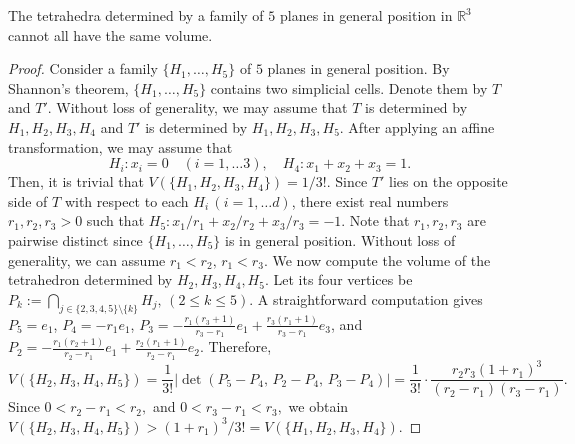 \documentclass[10pt,a4paper]{amsart}
\begin{document}
\begin{obs} \label{lem:redclique}
The tetrahedra determined by a family of $5$ planes in general position in $\mathbb{R}^3$ cannot all have the same volume.
\end{obs}

\begin{proof}
Consider a family $\{H_1, \ldots, H_5 \}$ of $5$ planes in general position. By Shannon's theorem, $\{H_1, \ldots, H_5 \}$ contains two simplicial cells. Denote them by $T$ and $T'$. Without loss of generality, we may assume that $T$ is determined by $H_1, H_2, H_3, H_4$ and $T'$ is determined by $H_1,H_2, H_3, H_5$. After applying an affine transformation, we may assume that
$$
H_i : x_i = 0  \quad (i = 1, \ldots 3), \quad H_{4} : x_1 + x_2 + x_3 = 1.
$$
Then, it is trivial that $V(\{H_1,H_2,H_3,H_4\}) = 1/3!$.
Since $T'$ lies on the opposite side of $T$ with respect to each $H_i \, (i=1, \ldots d)$, there exist real numbers $r_1, r_2, r_3 > 0$ such that
$H_5 : x_1/r_1 + x_2/r_2 + x_3/r_3 = -1$.
Note that $r_1, r_2, r_3$ are pairwise distinct since $\{H_1, \ldots, H_5 \}$ is in general position.
Without loss of generality, we can assume 
$
r_1<r_2,\,r_1<r_3.
$
We now compute the volume of the tetrahedron determined by $H_2,H_3,H_4,H_5$.
Let its four vertices be
$
P_k
:=
\bigcap_{j\in\{2,3,4,5\}\setminus\{k\}} H_j,
\, (2 \leq k \leq 5).
$
A straightforward computation gives
$P_5 = e_1$, $P_4=-r_1e_1$, $P_3=-\frac{r_1(r_3+1)}{r_3-r_1}e_1 + \frac{r_3(r_1+1)}{r_3-r_1}e_3$,
and
$P_2=-\frac{r_1(r_2+1)}{r_2-r_1}e_1 + \frac{r_2(r_1+1)}{r_2-r_1}e_2$.
Therefore,
$$
V(\{H_2,H_3,H_4,H_5\}) =
\frac{1}{3!}
\left|
\det
\left(
P_5-P_4,\,
P_2-P_4,\,
P_3-P_4
\right)
\right| 
=
\frac{1}{3!} \cdot
\frac{
r_2r_3(1+r_1)^3
}{
(r_2-r_1)(r_3-r_1)
}.
$$
Since
$
0<r_2-r_1<r_2,
$
and
$
0<r_3-r_1<r_3,
$
we obtain
$
V(\{H_2,H_3,H_4,H_5\}) > (1+r_1)^3/3! = V(\{H_1,H_2,H_3,H_4\}).
$
\end{proof}
\end{document}
